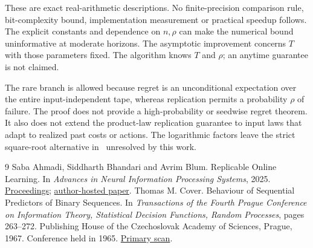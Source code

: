 \documentclass[11pt]{article}
\theoremstyle{remark}\newtheorem{remark}[theorem]{Remark}
\begin{document}
These are exact real-arithmetic descriptions. No finite-precision
comparison rule, bit-complexity bound, implementation measurement or
practical speedup follows. The explicit constants and dependence on
$n,\rho$ can make the numerical bound uninformative at moderate
horizons. The asymptotic improvement concerns $T$ with those parameters
fixed. The algorithm knows $T$ and $\rho$; an anytime guarantee is not
claimed.

The rare branch is allowed because regret is an unconditional
expectation over the entire input-independent tape, whereas replication
permits a probability $\rho$ of failure. The proof does not provide a
high-probability or seedwise regret theorem. It also does not extend
the product-law replication guarantee to input laws that adapt to
realized past costs or actions. The logarithmic factors leave the
strict square-root alternative in~\cite{abb} unresolved by this work.

\begin{thebibliography}{9}
Saba Ahmadi, Siddharth Bhandari and Avrim Blum.
\newblock Replicable Online Learning.
\newblock In \emph{Advances in Neural Information Processing Systems}, 2025.
\newblock \href{https://proceedings.neurips.cc/paper_files/paper/2025/hash/da8abfd153886b745278b40b5df0be93-Abstract-Conference.html}{Proceedings};
\href{https://home.ttic.edu/~avrim/Papers/24226_Replicable_Online_Learni.pdf}{author-hosted paper}.
Thomas M. Cover.
\newblock Behaviour of Sequential Predictors of Binary Sequences.
\newblock In \emph{Transactions of the Fourth Prague Conference on
Information Theory, Statistical Decision Functions, Random Processes},
pages 263--272. Publishing House of the Czechoslovak Academy of Sciences,
Prague, 1967. Conference held in 1965.
\newblock \href{https://isl.stanford.edu/~cover/papers/paper3.pdf}{Primary scan}.
\end{thebibliography}
\end{document}
